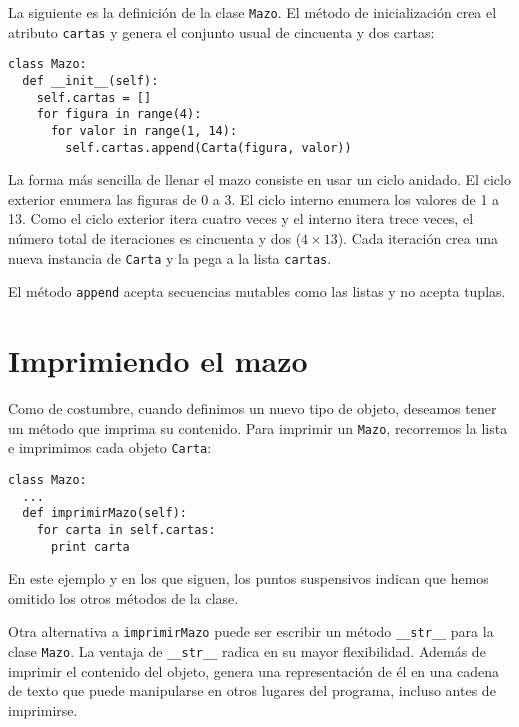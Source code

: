 
La siguiente es la definición de la clase  \texttt{Mazo}. El método de inicialización crea el atributo  \texttt{cartas} y genera el conjunto usual de cincuenta y dos cartas:


\beforeverb
\begin{verbatim}
class Mazo:
  def __init__(self):
    self.cartas = []
    for figura in range(4):
      for valor in range(1, 14):
        self.cartas.append(Carta(figura, valor))
\end{verbatim}
\afterverb
%
La forma más sencilla de llenar el mazo consiste en usar un ciclo anidado. El ciclo exterior enumera 
las figuras de 0 a 3. El ciclo interno enumera los valores de 1 a 13. Como el ciclo exterior itera 
cuatro veces y el interno itera trece veces, el número total de iteraciones es cincuenta y dos ($4 \times 13$). 
Cada iteración crea una nueva instancia de \texttt{Carta} y la pega a la lista \texttt{cartas}.

El método \texttt{append} acepta secuencias mutables como las listas y no acepta tuplas.



\section{Imprimiendo el mazo}
\label{printdeck}

Como de costumbre, cuando definimos un nuevo tipo de objeto, deseamos tener un método que imprima su contenido. Para imprimir un \texttt{Mazo}, recorremos la lista e imprimimos cada objeto \texttt{Carta}:

\beforeverb
\begin{verbatim}
class Mazo:
  ...
  def imprimirMazo(self):
    for carta in self.cartas:
      print carta
\end{verbatim}
\afterverb
%
En este ejemplo y en los que siguen, los puntos suspensivos indican que hemos omitido los otros métodos de la clase.

Otra alternativa a  \texttt{imprimirMazo} puede ser escribir un método
 \texttt{\_\_str\_\_} para la clase \texttt{Mazo}.  La ventaja de
 \texttt{\_\_str\_\_} radica en su mayor flexibilidad.  Además de imprimir el contenido del objeto, 
genera una representación de él en una cadena de texto que puede manipularse en otros lugares del 
programa, incluso antes de imprimirse.

